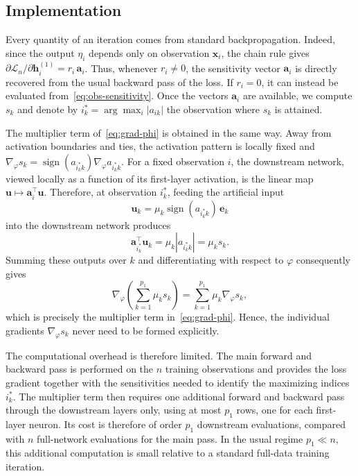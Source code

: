 \documentclass[twoside,11pt]{article}
\newcommand{\ba}{\mathbf{a}}
\newcommand{\bx}{\mathbf{x}}
\begin{document}
\subsection{Implementation}\label{sec:computation}
Every quantity of an iteration comes from standard backpropagation. Indeed, since the output $\eta_i$ depends only on observation $\bx_i$, the chain rule gives $\partial \mathcal L_n/\partial \mathbf h_i^{(1)}=r_i\,\ba_i$. Thus, whenever $r_i\neq0$, the sensitivity vector $\ba_i$ is directly recovered from the usual backward pass of the loss. If $r_i=0$, it can
instead be evaluated from~\eqref{eq:obs-sensitivity}. Once the
vectors $\ba_i$ are available, we compute $s_k$ and denote by $i_k^*=\arg\max_i |a_{ik}|$ the observation where $s_k$ is attained. 

The multiplier term of~\eqref{eq:grad-phi} is obtained in the same way. Away from activation boundaries and ties, the activation pattern is locally fixed and $\nabla_\varphi s_k=
\operatorname{sign}(a_{i_k^*k})\nabla_\varphi a_{i_k^*k}$. For a fixed observation $i$, the downstream network, viewed locally as
a function of its first-layer activation, is the linear map $\mathbf u\mapsto\ba_i^\top\mathbf u$. Therefore, at observation $i_k^*$, feeding the artificial input
\begin{equation*}
    \mathbf u_k=\mu_k\operatorname{sign}(a_{i_k^*k})\,\mathbf e_k
\end{equation*}
into the downstream network produces
\begin{equation*}
    \ba_{i_k^*}^{\top}\mathbf u_k = \mu_k|a_{i_k^*k}|
    = \mu_k s_k.
\end{equation*}
Summing these outputs over $k$ and differentiating with respect to $\varphi$ consequently gives
\begin{equation*}
    \nabla_\varphi
    \left(\sum_{k=1}^{p_1}\mu_k s_k\right)
    =
    \sum_{k=1}^{p_1}\mu_k\nabla_\varphi s_k,
\end{equation*}
which is precisely the multiplier term in~\eqref{eq:grad-phi}. Hence, the individual gradients $\nabla_\varphi s_k$ never need to be formed explicitly.

The computational overhead is therefore limited. The main forward and backward pass is performed on the $n$ training observations and provides the loss gradient together with the sensitivities needed to identify the maximizing indices $i_k^*$. The multiplier term then requires one additional forward and backward pass through the downstream layers only, using at most $p_1$ rows, one for each first-layer neuron. Its cost is therefore of order $p_1$ downstream evaluations, compared with $n$ full-network evaluations for the main pass. In the usual regime $p_1\ll n$, this additional computation is small relative to a standard full-data training iteration.
\end{document}
